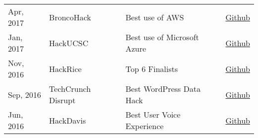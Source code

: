 \documentclass[]{deedy-resume-openfont}
\begin{document}
\begin{minipage}[t]{0.66\textwidth}
\begin{tabular}{ l l l l }
Apr, 2017 & BroncoHack & Best use of AWS & \href{https://github.com/desaiuditd/slycam}{Github} \\

Jan, 2017 & HackUCSC & Best use of Microsoft Azure & \href{https://github.com/desaiuditd/outtatheblues}{Github} \\

Nov, 2016 & HackRice & Top 6 Finalists  & \href{https://github.com/desaiuditd/wayfarer}{Github} \\

Sep, 2016 & TechCrunch Disrupt & Best WordPress Data Hack & \href{https://github.com/desaiuditd/incognitech}{Github} \\

Jun, 2016 & HackDavis & Best User Voice Experience & \href{https://github.com/desaiuditd/roomscore}{Github} \\

\end{tabular}

\end{minipage} 
\end{document}
